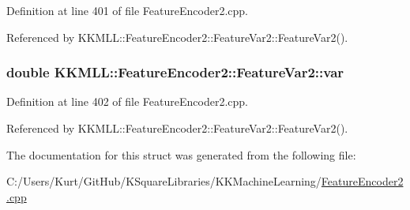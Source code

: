 Definition at line 401 of file Feature\+Encoder2.\+cpp.



Referenced by K\+K\+M\+L\+L\+::\+Feature\+Encoder2\+::\+Feature\+Var2\+::\+Feature\+Var2().

\subsubsection[{\texorpdfstring{var}{var}}]{\setlength{\rightskip}{0pt plus 5cm}double K\+K\+M\+L\+L\+::\+Feature\+Encoder2\+::\+Feature\+Var2\+::var}\hypertarget{struct_feature_encoder2_1_1_feature_var2_a6d42ea33b0c3ca09fab67f5ed85dc172}{}\label{struct_feature_encoder2_1_1_feature_var2_a6d42ea33b0c3ca09fab67f5ed85dc172}


Definition at line 402 of file Feature\+Encoder2.\+cpp.



Referenced by K\+K\+M\+L\+L\+::\+Feature\+Encoder2\+::\+Feature\+Var2\+::\+Feature\+Var2().



The documentation for this struct was generated from the following file\+:\begin{DoxyCompactItemize}
\item 
C\+:/\+Users/\+Kurt/\+Git\+Hub/\+K\+Square\+Libraries/\+K\+K\+Machine\+Learning/\hyperlink{_feature_encoder2_8cpp}{Feature\+Encoder2.\+cpp}\end{DoxyCompactItemize}
